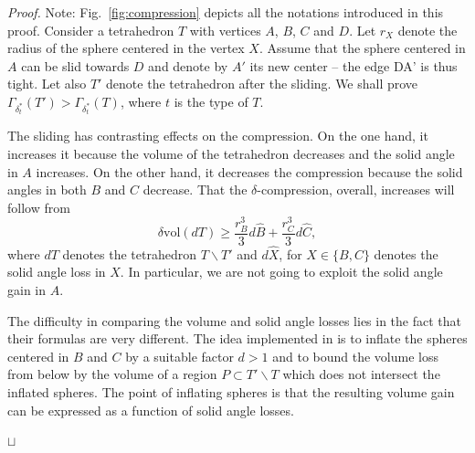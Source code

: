 \documentclass[11pt]{article}
\newenvironment{proof}{\noindent \emph{Proof. }}{\hfill \hbox{\rlap{$\sqcap$}$\sqcup$}\\}
\begin{document}
\begin{proof}
Note: Fig.~\ref{fig:compression} depicts all the notations introduced in this proof.
Consider a tetrahedron $T$ with vertices $A$, $B$, $C$ and $D$.
Let $r_X$ denote the radius of the sphere centered in the vertex $X$.
Assume that the sphere centered in $A$ can be slid towards $D$ and denote by $A'$ its new center -- the edge DA' is thus tight.
Let also $T'$ denote the tetrahedron after the sliding.
We shall prove $\Gamma_{\delta^*_t}(T')>\Gamma_{\delta^*_t}(T)$, where $t$ is the type of $T$.

The sliding has contrasting effects on the compression.
On the one hand, it increases it because the volume of the tetrahedron decreases and the solid angle in $A$ increases.
On the other hand, it decreases the compression because the solid angles in both $B$ and $C$ decrease.
That the $\delta$-compression, overall, increases will follow from
\begin{equation}
\label{eq:sliding1}
\delta\textrm{vol}(dT)\geq \frac{r_B^3}{3}d\widehat{B}+\frac{r_C^3}{3}d\widehat{C},
\end{equation}
where $dT$ denotes the tetrahedron $T\backslash T'$ and $d\widehat{X}$, for $X\in\{B,C\}$ denotes the solid angle loss in $X$.
In particular, we are not going to exploit the solid angle gain in $A$.

The difficulty in comparing the volume and solid angle losses lies in the fact that their formulas are very different.
The idea implemented in \cite{Hal97} is to inflate the spheres centered in $B$ and $C$ by a suitable factor $d>1$ and to bound the volume loss from below by the volume of a region $P\subset T'\backslash T$ which does not intersect the inflated spheres.
The point of inflating spheres is that the resulting volume gain can be expressed as a function of solid angle losses.


\end{proof}
\end{document}
